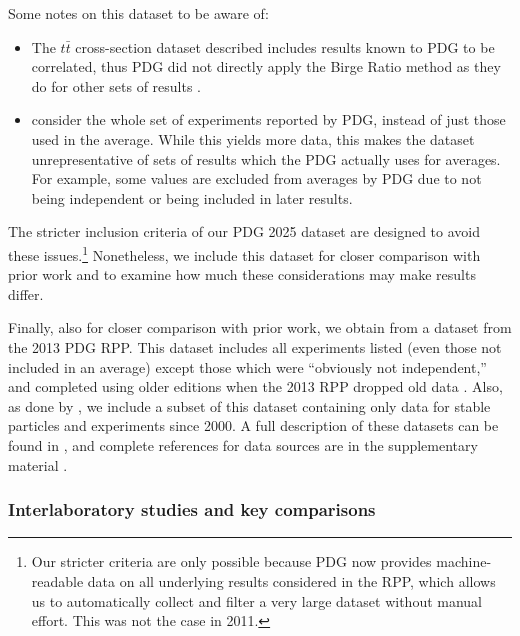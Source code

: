 \documentclass[letterpaper,12pt]{article}
\begin{document}
Some notes on this dataset to be aware of:
\begin{itemize}
\item The $t\bar{t}$ cross-section dataset described includes results known to PDG to be correlated, thus PDG did not directly apply the Birge Ratio method as they do for other sets of results \citep{pdg2011topquark}.
\item \citet{baker2013meta} consider the whole set of experiments reported by PDG, instead of just those used in the average. While this yields more data, this makes the dataset unrepresentative of sets of results which the PDG actually uses for averages. For example, some values are excluded from averages by PDG due to not being independent or being included in later results.
\end{itemize}
The stricter inclusion criteria of our PDG 2025 dataset are designed to avoid these issues.\footnote{Our stricter criteria are only possible because PDG now provides machine-readable data on all underlying results considered in the RPP, which allows us to automatically collect and filter a very large dataset without manual effort. This was not the case in 2011.} Nonetheless, we include this dataset for closer comparison with prior work and to examine how much these considerations may make results differ.

Finally, also for closer comparison with prior work, we obtain from \citet{bailey2017not} a dataset from the 2013 PDG RPP. This dataset includes all experiments listed (even those not included in an average) except those which were ``obviously not independent,'' and completed using older editions when the 2013 RPP dropped old data \citep[sec.~2.2]{bailey2017not}. Also, as done by \citet{bailey2017not}, we include a subset of this dataset containing only data for stable particles and experiments since 2000. A full description of these datasets can be found in \citet[sec.~2.1-2.3, 3.4]{bailey2017not}, and complete references for data sources are in the supplementary material \citep{bailey2016data}.


\subsubsection{Interlaboratory studies and key comparisons}
\end{document}
